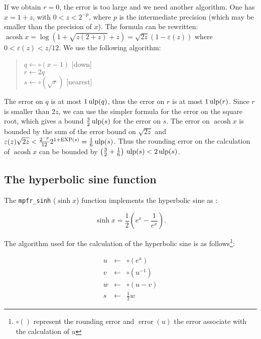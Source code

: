 \documentclass[12pt]{amsart}
\DeclareMathOperator{\acosh}{acosh}
\def\ulp{{\rm ulp}}
\def\Exp{{\rm EXP}}
\DeclareMathOperator{\error}{error}
\begin{document}
If we obtain $r = 0$, the error is too large and we need another algorithm.
One has $x = 1 + z$, with $0 < z < 2^{-p}$, where $p$ is the intermediate
precision (which may be smaller than the precision of $x$). The formula
can be rewritten:
$\acosh x = \log (1 + \sqrt{z(2+z)} + z) = \sqrt{2z} (1 - \varepsilon(z))$
where $0 < \varepsilon(z) < z / 12$.
We use the following algorithm:
\begin{quote}
$q \leftarrow \circ(x - 1)$ [down] \\
$r \leftarrow 2q$ \\
$s \leftarrow \circ(\sqrt{r})$ [nearest]
\end{quote}

The error on $q$ is at most $1\,\ulp(q)$, thus the error on $r$ is at most
$1\,\ulp(r)$. Since $r$ is smaller than $2z$, we can use the simpler formula
for the error on the square root, which gives a bound $\frac{3}{2}\,\ulp(s)$
for the error on $s$. The error on $\acosh x$ is bounded by the sum of the
error bound on $\sqrt{2z}$ and $\varepsilon(z) \sqrt{2z} <
\frac{2^{-p}}{12} 2^{1+\Exp(s)} = \frac{1}{6}\,\ulp(s)$.
Thus the rounding error on the calculation of $\acosh x$ can be bounded by
$\left(\frac{3}{2} + \frac{1}{6}\right)\,\ulp(s) < 2\,\ulp(s)$.

\subsection{The hyperbolic sine function}

The {\tt mpfr\_sinh} ($\sinh{x}$) function implements the hyperbolic
sine as :

\[\sinh x = \frac{1}{2} \left( e^{x} - \frac{1}{e^x} \right).\]

The algorithm used for the calculation of the hyperbolic sine is as follows\footnote{$\circ()$ represent the rounding error and $\error(u)$ the
  error associate with the calculation of $u$}:

\begin{eqnarray}\nonumber
u&\leftarrow&\circ(e^x)\\\nonumber
v&\leftarrow&\circ({u}^{-1})\\\nonumber
w&\leftarrow&\circ(u-v)\\\nonumber
s&\leftarrow&\frac{1}{2} w
\end{eqnarray}
\end{document}
